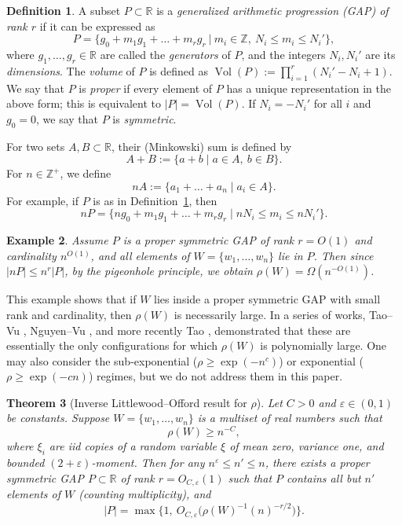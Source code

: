 \documentclass[reqno]{amsart}
\newcommand\R{{\mathbb{R}}}
\newcommand\Z{{\mathbb{Z}}}
\newcommand\eps{{\varepsilon}}
\def\Vol{\operatorname{Vol}}
\theoremstyle{plain}
\newtheorem{theorem}{Theorem}[section]
\newtheorem{example}[theorem]{Example}
\theoremstyle{definition}
\newtheorem{definition}[theorem]{Definition}
\begin{document}
\begin{definition}\label{def:GAP}
A subset \( P \subset \R \) is a \emph{generalized arithmetic progression (GAP) of rank \( r \)} if it can be expressed as
\[
P = \Big\{ g_0 + m_1 g_1 + \dots + m_r g_r \ \Big| \ m_i \in \Z,\ N_i \le m_i \le N_i' \Big\},
\]
where \( g_1, \dots, g_r \in \R \) are called the \emph{generators} of \( P \), and the integers \( N_i, N_i' \) are its \emph{dimensions}. The \emph{volume} of \( P \) is defined as \( \Vol(P) := \prod_{i=1}^r (N_i' - N_i + 1) \). We say that \( P \) is \emph{proper} if every element of \( P \) has a unique representation in the above form; this is equivalent to \( |P| = \Vol(P) \). If \( N_i = -N_i' \) for all \( i \) and \( g_0 = 0 \), we say that \( P \) is \emph{symmetric}.
\end{definition}

For two sets \( A, B \subset \R \), their (Minkowski) sum is defined by
\[
A + B := \{ a + b \mid a \in A,\ b \in B \}.
\]
For \( n \in \Z^+ \), we define
\[
nA := \{ a_1 + \dots + a_n \mid a_i \in A \}.
\]
For example, if \( P \) is as in Definition~\ref{def:GAP}, then
\[
nP = \Big\{ ng_0 + m_1 g_1 + \dots + m_r g_r \mid nN_i \le m_i \le nN_i' \Big\}.
\]

\begin{example}
Assume \( P \) is a proper symmetric GAP of rank \( r = O(1) \) and cardinality \( n^{O(1)} \), and all elements of \( W = \{w_1, \dots, w_n\} \) lie in \( P \). 
Then since \( |nP| \le n^r |P| \), by the pigeonhole principle, we obtain \( \rho(W) = \Omega(n^{-O(1)}) \).
\end{example}
This example shows that if \( W \) lies inside a proper symmetric GAP with small rank and cardinality, then \( \rho(W) \) is necessarily large. In a series of works, 
Tao--Vu \cite{TVstrong,TVinverse}, 
Nguyen--Vu \cite{NgV-Adv}, and more recently Tao \cite{Tao}, demonstrated that these are essentially the only configurations for which \( \rho(W) \) is polynomially large. One may also consider the sub-exponential (\( \rho \ge \exp(-n^c) \)) or exponential (\( \rho \ge \exp(-cn) \)) regimes, but we do not address them in this paper.

\begin{theorem}[Inverse Littlewood--Offord result for \( \rho \)]\cite[Theorem 2.1]{NgV-Adv}\label{thm:ILO}
Let \( C>0\) and \( \eps \in (0,1) \) be constants. Suppose \( W = \{w_1, \dots, w_n\} \) is a multiset of real numbers such that
\[
\rho(W) \ge n^{-C},
\]
where $\xi_{i}$ are iid copies of a random variable $\xi$ of mean zero, variance one, and bounded $(2+\eps)$-moment. Then for any \( n^\eps \le n' \le n \), there exists a proper symmetric GAP \( P \subset \R \) of rank \( r = O_{C, \eps}(1) \) such that \( P \) contains all but \( n' \) elements of \( W \) (counting multiplicity), and
\[
|P| = \max\Big\{ 1,\ O_{C, \eps}\Big(\rho(W)^{-1} (n)^{-r/2} \Big) \Big\}.
\]
\end{theorem}
\end{document}
